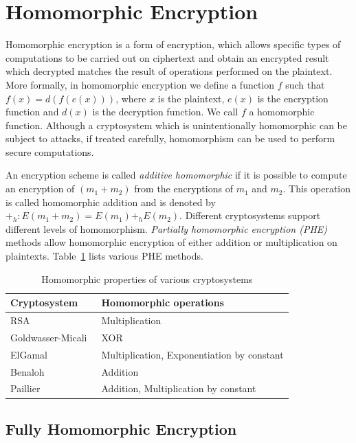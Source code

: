 \documentclass[10pt]{article}
\theoremstyle{plain}
\begin{document}
\section{Homomorphic Encryption}

Homomorphic encryption is a form of encryption, which allows specific
types of computations to be carried out on ciphertext and obtain an
encrypted result which decrypted matches the result of operations
performed on the plaintext. More formally, in homomorphic encryption
we define a function $f$ such that $f(x)=d(f(e(x)))$, where $x$
is the plaintext, $e(x)$ is the encryption function and $d(x)$ is
the decryption function. We call $f$ a homomorphic function. Although
a cryptosystem which is unintentionally homomorphic can be subject
to attacks, if treated carefully, homomorphism can be used to perform
secure computations.

An encryption scheme is called \emph{additive homomorphic} if it is
possible to compute an encryption of $(m_{1}+m_{2})$ from the encryptions
of $m_{1}$ and $m_{2}$. This operation is called homomorphic addition
and is denoted by $+_{h}:E(m_{1}+m_{2})=E(m_{1})+_{h}E(m_{2})$. Different
cryptosystems support different levels of homomorphism. \textit{Partially
	homomorphic encryption (PHE)} methods allow homomorphic encryption
of either addition or multiplication on plaintexts. Table~\ref{tab:partial-he}
lists various PHE methods.

\begin{table}[H]
	\caption{Homomorphic properties of various cryptosystems}
	\label{tab:partial-he}
	\centering{}\vspace{7pt}
	\begin{tabular}{l|l}
		\hline 
		\textbf{Cryptosystem } & \textbf{Homomorphic operations }\tabularnewline
		\hline 
		RSA~\cite{Rivest:1978:MOD:359340.359342}  & Multiplication\tabularnewline
		Goldwasser-Micali~\cite{Goldwasser:1982:PEA:800070.802212}  & XOR \tabularnewline
		ElGamal~\cite{ElGamal:1985:PKC:19478.19480}  & Multiplication, Exponentiation by constant\tabularnewline
		Benaloh~\cite{Benaloh94denseprobabilistic}  & Addition \tabularnewline
		Paillier~\cite{Paillier:1999:PCB:1756123.1756146}  & Addition, Multiplication by constant \tabularnewline
		\hline 
	\end{tabular} 
\end{table}


\subsection{Fully Homomorphic Encryption}
\end{document}
